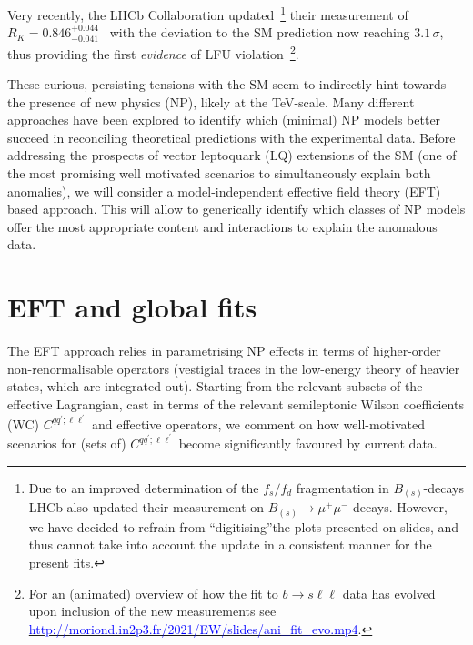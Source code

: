 \documentclass[a4paper,11pt]{article}
\def\bsll{b \to s\ell\ell}
\def\rk{R_{K}}
\begin{document}
Very recently, the LHCb Collaboration updated~\footnote{Due to an improved determination of the $f_s/f_d$ fragmentation in $B_{(s)}$-decays LHCb also updated their measurement on $B_{(s)}\to \mu^+\mu^-$ decays. However, we have decided to refrain from ``digitising''the plots presented on slides, and thus cannot take into account the update in a consistent manner for the present fits.} their measurement of $\rk = 0.846^{+0.044}_{-0.041}$~\cite{Aaij:2021vac} with the deviation to the SM prediction now reaching $3.1\,\sigma$, thus providing the first {\it evidence} of LFU violation~\footnote{For an (animated) overview of how the fit to $\bsll$ data has evolved upon inclusion of the new measurements see \href{http://moriond.in2p3.fr/2021/EW/slides/ani_fit_evo.mp4}{\textcolor{blue}{http://moriond.in2p3.fr/2021/EW/slides/ani\_fit\_evo.mp4}}.}.

These curious, persisting tensions with the SM seem to indirectly hint towards the presence of new physics (NP), likely at the TeV-scale. 
Many different approaches have been explored to identify 
which (minimal) NP models better succeed in reconciling theoretical predictions with the experimental data. 
Before addressing the prospects of vector leptoquark (LQ) extensions of the SM (one of the most promising well motivated scenarios to simultaneously explain both anomalies), we will consider a model-independent effective field theory (EFT) based approach. This will allow to generically identify which classes of NP models offer the most appropriate content and interactions to explain the anomalous data. 

\section{EFT and global fits}
The EFT approach relies in parametrising NP effects in terms of higher-order non-renormalisable operators (vestigial traces in the low-energy theory of heavier  states, which are integrated out). Starting from the relevant subsets of the effective Lagrangian, cast in terms of the relevant semileptonic Wilson coefficients (WC) $C^{q q^\prime; \ell \ell^\prime }$ and effective operators, we
comment on how well-motivated scenarios for (sets of) $C^{q q^\prime; \ell \ell^\prime }$ become significantly favoured by current data.
\end{document}
